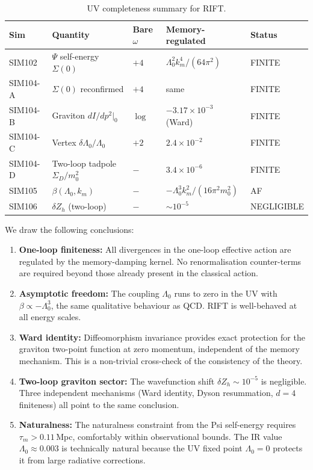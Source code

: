 \documentclass[12pt,a4paper]{article}
\begin{document}
\begin{table}[H]
\centering
\caption{UV completeness summary for RIFT.}
\begin{tabular}{lllll}
\toprule
Sim & Quantity & Bare $\omega$ & Memory-regulated & Status \\
\midrule
SIM102 & $\Psi$ self-energy $\Sigma(0)$ & $+4$ & $\Lambda_0^2 k_m^4/(64\pi^2)$ & FINITE \\
SIM104-A & $\Sigma(0)$ reconfirmed & $+4$ & same & FINITE \\
SIM104-B & Graviton $dI/dp^2|_0$ & $\log$ & $-3.17\times10^{-3}$ (Ward) & FINITE \\
SIM104-C & Vertex $\delta\Lambda_0/\Lambda_0$ & $+2$ & $2.4\times10^{-2}$ & FINITE \\
SIM104-D & Two-loop tadpole $\Sigma_D/m_0^2$ & $-$ & $3.4\times10^{-6}$ & FINITE \\
SIM105 & $\beta(\Lambda_0,k_m)$ & $-$ & $-\Lambda_0^3 k_m^2/(16\pi^2 m_0^2)$ & AF \\
SIM106 & $\delta Z_h$ (two-loop) & $-$ & $\sim10^{-5}$ & NEGLIGIBLE \\
\bottomrule
\end{tabular}
\label{tab:summary}
\end{table}

We draw the following conclusions:

\begin{enumerate}
\item \textbf{One-loop finiteness:} All divergences in the one-loop
      effective action are regulated by the memory-damping kernel.
      No renormalisation counter-terms are required beyond those
      already present in the classical action.

\item \textbf{Asymptotic freedom:} The coupling $\Lambda_0$ runs to
      zero in the UV with $\beta\propto-\Lambda_0^3$, the same
      qualitative behaviour as QCD.  RIFT is well-behaved at all
      energy scales.

\item \textbf{Ward identity:} Diffeomorphism invariance provides
      exact protection for the graviton two-point function at zero
      momentum, independent of the memory mechanism.  This is a
      non-trivial cross-check of the consistency of the theory.

\item \textbf{Two-loop graviton sector:} The wavefunction shift
      $\delta Z_h\sim10^{-5}$ is negligible.  Three independent
      mechanisms (Ward identity, Dyson resummation, $d=4$ finiteness)
      all point to the same conclusion.

\item \textbf{Naturalness:} The naturalness constraint from the Psi
      self-energy requires $\tau_m > 0.11$\,Mpc, comfortably within
      observational bounds.  The IR value $\Lambda_0\approx0.003$ is
      technically natural because the UV fixed point $\Lambda_0=0$
      protects it from large radiative corrections.
\end{enumerate}
\end{document}
